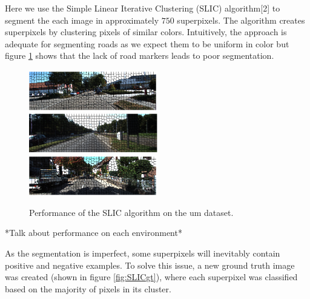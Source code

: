 \documentclass{article} %
\begin{document}
Here we use the Simple Linear Iterative Clustering (SLIC) algorithm[2] to segment the each image in approximately $750$ superpixels. The algorithm creates superpixels by clustering pixels of similar colors. Intuitively, the approach is adequate for segmenting roads as we expect them to be uniform in color but figure \ref{fig:SLIC} shows that the lack of road markers leads to poor segmentation.

\begin{figure}[ht!]
\centering
 \includegraphics[width=0.5\textwidth]{figs/SLICOuu.pdf}\\
 \vspace{-2pt}
 \includegraphics[width=0.5\textwidth]{figs/SLICOum.pdf}\\
 \vspace{-2pt}
 \includegraphics[width=0.5\textwidth]{figs/SLICOumm.pdf}\\
 \caption{Performance of the SLIC algorithm on the um dataset.}\label{fig:SLIC}
\end{figure}

*Talk about performance on each environment*

As the segmentation is imperfect, some superpixels will inevitably contain positive and negative examples. To solve this issue, a new ground truth image was created (shown in figure \ref{fig:SLICgt}), where each superpixel was classified based on the majority of pixels in its cluster.
\end{document}
